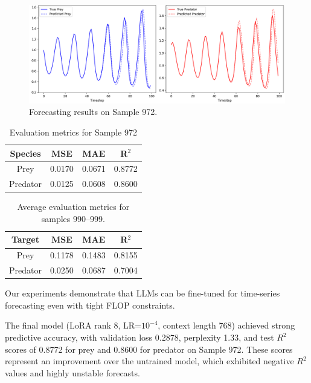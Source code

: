 \documentclass[a4paper,12pt]{article}
\begin{document}
\begin{figure}[H]
    \centering
    \includegraphics[width=0.95\linewidth]{sample972_trained.png}
    \caption{Forecasting results on Sample 972.}
    \label{fig:sample_prediction}
\end{figure}

\begin{table}[H]
    \centering

    \begin{tabular}{|c|c|c|c|}
        \hline
        \textbf{Species} & \textbf{MSE} & \textbf{MAE} & \textbf{R$^2$} \\
        \hline
        Prey & 0.0170 & 0.0671 & 0.8772 \\
        Predator & 0.0125 & 0.0608 & 0.8600 \\
        \hline
    \end{tabular}
    \vspace{0.2cm}
    \caption{Evaluation metrics for Sample 972}
    \label{tab:metrics_sample972}
\end{table}

\begin{table}[H]
  \centering
  \begin{tabular}{|c|c|c|c|}
      \hline
      \textbf{Target} & \textbf{MSE} & \textbf{MAE} & \textbf{R$^2$} \\
      \hline
      Prey & 0.1178 & 0.1483 & 0.8155 \\
      Predator & 0.0250 & 0.0687 & 0.7004 \\
      \hline
  \end{tabular}
  \vspace{0.2cm}
  \caption{Average evaluation metrics for samples 990–999.}
  \label{tab:avg_metrics_990_999}
  \end{table}

  Our experiments demonstrate that LLMs can be fine-tuned for time-series forecasting even with tight FLOP constraints.
  
  The final model (LoRA rank 8, LR=$10^{-4}$, context length 768) achieved strong predictive accuracy, with validation loss 0.2878, perplexity 1.33, and test $R^2$ scores of 0.8772 for prey and 0.8600 for predator on Sample 972. These scores represent an improvement over the untrained model, which exhibited negative $R^2$ values and highly unstable forecasts.
  
\end{document}
